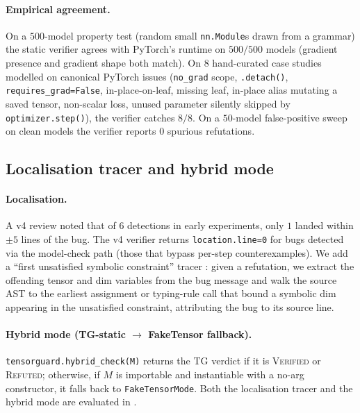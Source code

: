 \paragraph{Empirical agreement.}
On a $500$-model property test (random small \texttt{nn.Module}s
drawn from a grammar) the static verifier agrees with PyTorch's
runtime on $500/500$ models (gradient presence and gradient
shape both match). On $8$ hand-curated case studies modelled on
canonical PyTorch issues (\texttt{no\_grad} scope,
\texttt{.detach()}, \texttt{requires\_grad=False},
in-place-on-leaf, missing leaf, in-place alias mutating a saved
tensor, non-scalar loss, unused parameter silently skipped by
\texttt{optimizer.step()}), the verifier catches $8/8$. On a
$50$-model false-positive sweep on clean models the verifier
reports $0$ spurious refutations.

\subsection{Localisation tracer and hybrid mode}
\label{sec:impl-loc-hybrid}

\paragraph{Localisation.} A v4 review noted that of $6$
detections in early experiments, only $1$ landed within $\pm 5$
lines of the bug. The v4 verifier returns
\texttt{location.line=0} for bugs detected via the model-check
path (those that bypass per-step counterexamples). We add a
``first unsatisfied symbolic constraint'' tracer
: given a refutation, we
extract the offending tensor and dim variables from the bug
message and walk the source AST to the earliest assignment or
typing-rule call that bound a symbolic dim appearing in the
unsatisfied constraint, attributing the bug to its source line.

\paragraph{Hybrid mode (TG-static $\to$ FakeTensor fallback).}
\texttt{tensorguard.hybrid\_check(M)}
 returns the TG verdict if it
is \textsc{Verified} or \textsc{Refuted}; otherwise, if $M$ is
importable and instantiable with a no-arg constructor, it falls
back to \texttt{FakeTensorMode}. Both the localisation tracer
and the hybrid mode are evaluated in
.
